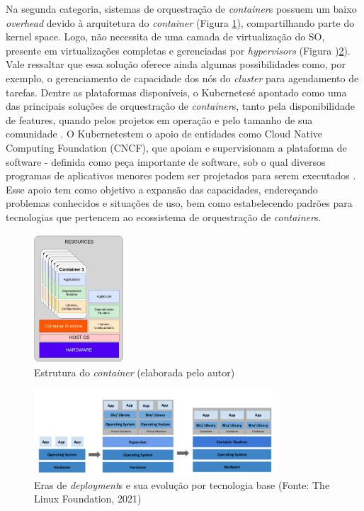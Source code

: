Na segunda categoria, sistemas de orquestração de \emph{container}s possuem um baixo \emph{overhead} devido à arquitetura do \emph{container} (Figura \ref{fig:container}), compartilhando parte do kernel space. Logo, não necessita de uma camada de virtualização do SO, presente em virtualizações completas e gerenciadas por \emph{hypervisors} (Figura )\ref{fig:vmscontainer}). Vale ressaltar que essa solução oferece ainda algumas possibilidades como, por exemplo,  o gerenciamento de capacidade dos nós do \emph{cluster} para agendamento de tarefas. Dentre as plataformas disponíveis, o Kubernetes\textregistered é apontado como uma das principais soluções de orquestração de \emph{container}s, tanto pela disponibilidade de features, quando pelos projetos em operação e pelo tamanho de sua comunidade \cite{truyen_comprehensive_2021}. O Kubernetes\textregistered tem o apoio de entidades como Cloud Native Computing Foundation (CNCF), que apoiam e supervisionam a plataforma de software -  definida como peça importante de software, sob o qual diversos programas de aplicativos menores podem ser projetados para serem executados \cite{collins2022}. Esse apoio tem como objetivo a expansão  das capacidades, endereçando problemas conhecidos e situações de uso, bem como estabelecendo padrões para tecnologias que pertencem ao ecossistema de orquestração de \emph{container}s.

\begin{figure}[!h]
    \centering
    \includegraphics[width=0.3\textwidth]{04-figuras/containers.png}
    \caption{Estrutura do \emph{container} (elaborada pelo autor)}
    \label{fig:container}
\end{figure}

\begin{figure}[!h]
    \centering
    \includegraphics[width=0.8\textwidth]{04-figuras/vmsContainer.png}
    \caption{Eras de \emph{deployment}s e sua evolução por tecnologia base (Fonte: The Linux Foundation\textregistered, 2021)}
    \label{fig:vmscontainer}
\end{figure}

